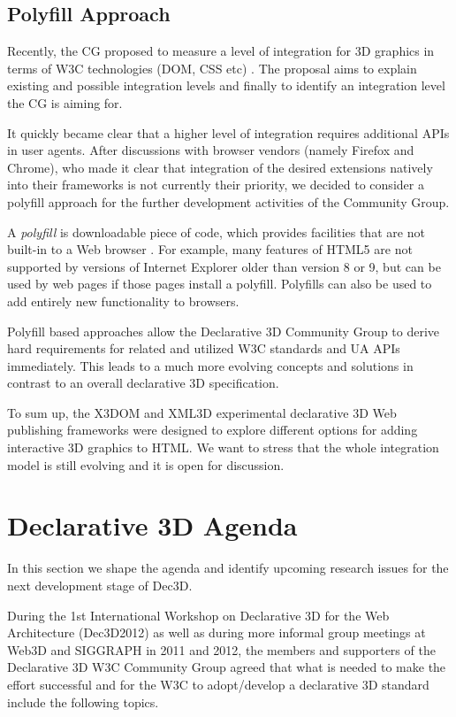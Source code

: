 \documentclass[review]{acmsiggraph}
\begin{document}
\subsection{Polyfill Approach}

Recently, the CG proposed to measure a level of integration for 3D graphics in terms of W3C technologies (DOM, CSS etc) \cite{Dec3D-LevelsOfIntegration}. The proposal aims to explain existing and possible integration levels and finally to identify an integration level the CG is aiming for.

It quickly became clear that a higher level of integration requires additional APIs in user agents. After discussions with browser vendors (namely Firefox and Chrome), who made it clear that integration of the desired extensions natively into their frameworks is not currently their priority, we decided to consider a polyfill approach for the further development activities of the Community Group.

A \textit{polyfill} is downloadable piece of code, which provides facilities that are not built-in to a Web browser \cite{Sharp2010}. For example, many features of HTML5 are not supported by versions of Internet Explorer older than version 8 or 9, but can be used by web pages if those pages install a polyfill. Polyfills can also be used to add entirely new functionality to browsers.

Polyfill based approaches allow the Declarative 3D Community Group to derive hard requirements for related and utilized W3C standards and UA APIs immediately. This leads to a much more evolving concepts and solutions in contrast to an overall declarative 3D specification.

To sum up, the X3DOM and XML3D experimental declarative 3D Web publishing frameworks were designed to explore different options for adding interactive 3D graphics to HTML. We want to stress that the whole integration model is still evolving and it is open for discussion.


\section{Declarative 3D Agenda}

In this section we shape the agenda and identify upcoming research issues for the next development stage of Dec3D.

\label{sec:Agenda}
During the 1st International Workshop on Declarative 3D for the Web Architecture (Dec3D2012) \cite{Dec3D2012} as well as during more informal group meetings at Web3D and SIGGRAPH in 2011 and 2012, the members and supporters of the Declarative 3D W3C Community Group agreed that what is needed to make the effort successful and for the W3C to adopt/develop a declarative 3D standard include the following topics.
\end{document}
